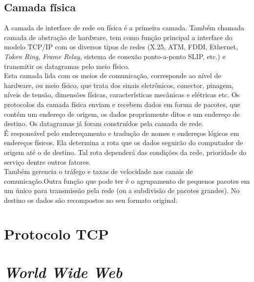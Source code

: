 \subsection{Camada física}
A camada de interface de rede ou física é a primeira camada. Também chamada 
camada de abstração de hardware, tem como função principal a interface do 
modelo TCP/IP com os diversos tipos de redes (X.25, ATM, FDDI, Ethernet, 
\textit{Token Ring}, \textit{Frame Relay}, sistema de conexão ponto-a-ponto 
SLIP, etc.) e transmitir os datagramas pelo meio físico.\\
Esta camada lida com os meios de comunicação, corresponde ao nível de hardware, 
ou meio físico, que trata dos sinais eletrônicos, conector, pinagem, níveis de 
tensão, dimensões físicas, características mecânicas e elétricas etc. Os 
protocolos da camada física enviam e recebem dados em forma de pacotes, que 
contém um endereço de origem, os dados propriamente ditos e um endereço de 
destino. Os datagramas já foram construídos pela camada de rede.\\
É responsável pelo endereçamento e tradução de nomes e endereços lógicos em 
endereços físicos. Ela determina a rota que os dados seguirão do computador de 
origem até o de destino. Tal rota dependerá das condições da rede, prioridade 
do serviço dentre outros fatores.\\
Também gerencia o tráfego e taxas de velocidade nos canais de comunicação.Outra 
função que pode ter é o agrupamento de pequenos pacotes em um único para  
transmissão pela rede (ou a subdivisão de pacotes grandes). No destino os dados 
são recompostos no seu formato original.\\
\section{Protocolo TCP}

\section{\textit{World Wide Web}}
